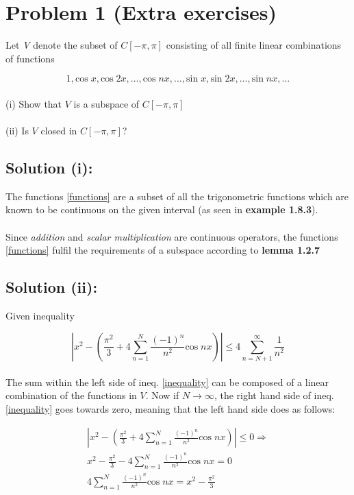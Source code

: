 \documentclass{article}
\begin{document}
\newpage
\section*{Problem 1 (Extra exercises)}

Let \textit{V} denote the subset of $C[-\pi,\pi]$ consisting of all finite linear combinations of functions

\begin{equation}\label{functions}
    1, \mathrm{cos}\;x, \mathrm{cos}\;2x, ... , \mathrm{cos}\;nx, ... , \mathrm{sin}\;x, \mathrm{sin}\;2x, ... , \mathrm{sin}\;nx, ...
\end{equation}
\\
(i) Show that $V$ is a subspace of $C[-\pi,\pi]$ \\
\\
(ii) Is $V$ closed in $C[-\pi,\pi]$? 


\subsection*{Solution (i):}

The functions \eqref{functions} are a subset of all the trigonometric functions which are known to be continuous on the given interval (as seen in \textbf{example 1.8.3}). \\
\\
Since \textit{addition} and \textit{scalar multiplication} are continuous operators, the functions \eqref{functions} fulfil the requirements of a subspace according to \textbf{lemma 1.2.7}

\subsection*{Solution (ii):}

Given inequality 

\begin{equation}\label{inequality}
    \left| x^2 -\left( \frac{\pi^2}{3} + 4 \sum_{n=1}^N \frac{(-1)^n}{n^2} \mathrm{cos} \; n x \right) \right| \leq 4 \sum_{n=N+1}^{\infty} \frac{1}{n^2}
\end{equation}
\\
The sum within the left side of ineq. \eqref{inequality} can be composed of a linear combination of the functions in $V$. Now if $N \rightarrow \infty$, the right hand side of ineq.\eqref{inequality} goes towards zero, meaning that the left hand side does as follows:


\begin{gather}
    \left| x^2 -\left( \frac{\pi^2}{3} + 4 \sum_{n=1}^N \frac{(-1)^n}{n^2} \mathrm{cos} \; n x \right) \right| \leq 0 \Rightarrow \\
    x^2 - \frac{\pi^2}{3} - 4 \sum_{n=1}^N \frac{(-1)^n}{n^2} \mathrm{cos} \; n x  = 0 \\
     4 \sum_{n=1}^N \frac{(-1)^n}{n^2} \mathrm{cos} \; n x  = x^2 - \frac{\pi^2}{3}
\end{gather}
\end{document}

